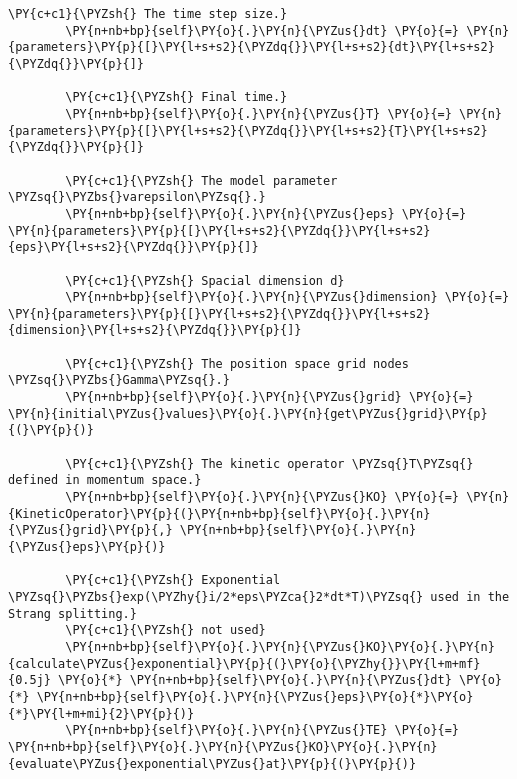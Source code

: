 \begin{Verbatim}[commandchars=\\\{\}]
        \PY{c+c1}{\PYZsh{} The time step size.}
        \PY{n+nb+bp}{self}\PY{o}{.}\PY{n}{\PYZus{}dt} \PY{o}{=} \PY{n}{parameters}\PY{p}{[}\PY{l+s+s2}{\PYZdq{}}\PY{l+s+s2}{dt}\PY{l+s+s2}{\PYZdq{}}\PY{p}{]}

        \PY{c+c1}{\PYZsh{} Final time.}
        \PY{n+nb+bp}{self}\PY{o}{.}\PY{n}{\PYZus{}T} \PY{o}{=} \PY{n}{parameters}\PY{p}{[}\PY{l+s+s2}{\PYZdq{}}\PY{l+s+s2}{T}\PY{l+s+s2}{\PYZdq{}}\PY{p}{]}

        \PY{c+c1}{\PYZsh{} The model parameter \PYZsq{}\PYZbs{}varepsilon\PYZsq{}.}
        \PY{n+nb+bp}{self}\PY{o}{.}\PY{n}{\PYZus{}eps} \PY{o}{=} \PY{n}{parameters}\PY{p}{[}\PY{l+s+s2}{\PYZdq{}}\PY{l+s+s2}{eps}\PY{l+s+s2}{\PYZdq{}}\PY{p}{]}

        \PY{c+c1}{\PYZsh{} Spacial dimension d}
        \PY{n+nb+bp}{self}\PY{o}{.}\PY{n}{\PYZus{}dimension} \PY{o}{=} \PY{n}{parameters}\PY{p}{[}\PY{l+s+s2}{\PYZdq{}}\PY{l+s+s2}{dimension}\PY{l+s+s2}{\PYZdq{}}\PY{p}{]}

        \PY{c+c1}{\PYZsh{} The position space grid nodes \PYZsq{}\PYZbs{}Gamma\PYZsq{}.}
        \PY{n+nb+bp}{self}\PY{o}{.}\PY{n}{\PYZus{}grid} \PY{o}{=} \PY{n}{initial\PYZus{}values}\PY{o}{.}\PY{n}{get\PYZus{}grid}\PY{p}{(}\PY{p}{)}

        \PY{c+c1}{\PYZsh{} The kinetic operator \PYZsq{}T\PYZsq{} defined in momentum space.}
        \PY{n+nb+bp}{self}\PY{o}{.}\PY{n}{\PYZus{}KO} \PY{o}{=} \PY{n}{KineticOperator}\PY{p}{(}\PY{n+nb+bp}{self}\PY{o}{.}\PY{n}{\PYZus{}grid}\PY{p}{,} \PY{n+nb+bp}{self}\PY{o}{.}\PY{n}{\PYZus{}eps}\PY{p}{)}

        \PY{c+c1}{\PYZsh{} Exponential \PYZsq{}\PYZbs{}exp(\PYZhy{}i/2*eps\PYZca{}2*dt*T)\PYZsq{} used in the Strang splitting.}
        \PY{c+c1}{\PYZsh{} not used}
        \PY{n+nb+bp}{self}\PY{o}{.}\PY{n}{\PYZus{}KO}\PY{o}{.}\PY{n}{calculate\PYZus{}exponential}\PY{p}{(}\PY{o}{\PYZhy{}}\PY{l+m+mf}{0.5j} \PY{o}{*} \PY{n+nb+bp}{self}\PY{o}{.}\PY{n}{\PYZus{}dt} \PY{o}{*} \PY{n+nb+bp}{self}\PY{o}{.}\PY{n}{\PYZus{}eps}\PY{o}{*}\PY{o}{*}\PY{l+m+mi}{2}\PY{p}{)}
        \PY{n+nb+bp}{self}\PY{o}{.}\PY{n}{\PYZus{}TE} \PY{o}{=} \PY{n+nb+bp}{self}\PY{o}{.}\PY{n}{\PYZus{}KO}\PY{o}{.}\PY{n}{evaluate\PYZus{}exponential\PYZus{}at}\PY{p}{(}\PY{p}{)}


\end{Verbatim}

